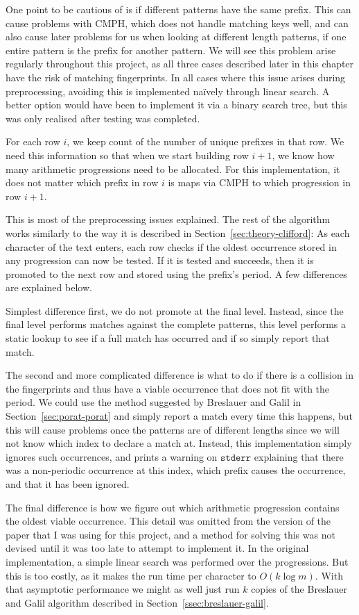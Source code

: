 \documentclass[ %
                    author={Dominic Joseph Moylett},
                    degree={MEng},
                     title={Dictionary Matching with Fingerprints},
                  subtitle={An Empirical Analysis},
                      type={Research},
                      year={2014} ]{dissertation}
\begin{document}
One point to be cautious of is if different patterns have the same prefix. This can cause problems with CMPH, which does not handle matching keys well, and can also cause later problems for us when looking at different length patterns, if one entire pattern is the prefix for another pattern. We will see this problem arise regularly throughout this project, as all three cases described later in this chapter have the risk of matching fingerprints. In all cases where this issue arises during preprocessing, avoiding this is implemented na\"{i}vely through linear search. A better option would have been to implement it via a binary search tree, but this was only realised after testing was completed.

For each row $i$, we keep count of the number of unique prefixes in that row. We need this information so that when we start building row $i+1$, we know how many arithmetic progressions need to be allocated. For this implementation, it does not matter which prefix in row $i$ is maps via CMPH to which progression in row $i+1$.

This is most of the preprocessing issues explained. The rest of the algorithm works similarly to the way it is described in Section~\ref{sec:theory-clifford}: As each character of the text enters, each row checks if the oldest occurrence stored in any progression can now be tested. If it is tested and succeeds, then it is promoted to the next row and stored using the prefix's period. A few differences are explained below.

Simplest difference first, we do not promote at the final level. Instead, since the final level performs matches against the complete patterns, this level performs a static lookup to see if a full match has occurred and if so simply report that match.

The second and more complicated difference is what to do if there is a collision in the fingerprints and thus have a viable occurrence that does not fit with the period. We could use the method suggested by Breslauer and Galil in Section~\ref{sec:porat-porat} and simply report a match every time this happens, but this will cause problems once the patterns are of different lengths since we will not know which index to declare a match at. Instead, this implementation simply ignores such occurrences, and prints a warning on $\texttt{stderr}$ explaining that there was a non-periodic occurrence at this index, which prefix causes the occurrence, and that it has been ignored.

The final difference is how we figure out which arithmetic progression contains the oldest viable occurrence. This detail was omitted from the version of the paper that I was using for this project, and a method for solving this was not devised until it was too late to attempt to implement it. In the original implementation, a simple linear search was performed over the progressions. But this is too costly, as it makes the run time per character to $O(k\log m)$. With that asymptotic performance we might as well just run $k$ copies of the Breslauer and Galil algorithm described in Section~\ref{ssec:breslauer-galil}.
\end{document}
